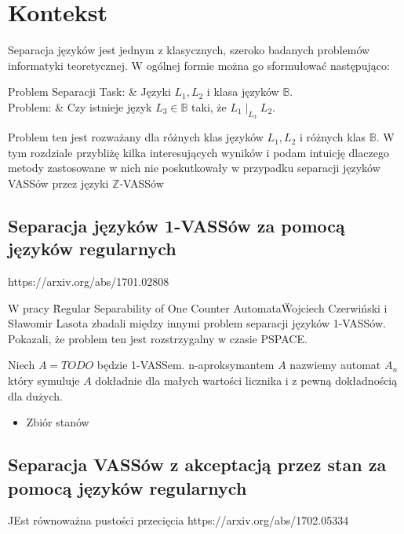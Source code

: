     \chapter{Kontekst}
    Separacja języków jest jednym z klasycznych, szeroko badanych problemów informatyki teoretycznej.
    W ogólnej formie można go sformułować następująco:


    \begin{problem}[]{Problem Separacji}
        Task: & Języki $L_1,L_2$ i klasa języków $\mathbb{B}$.\\
        Problem: & Czy istnieje język $L_3 \in \mathbb{B}$ taki, że $L_1 \mid_{L_3} L_2$. \\
    \end{problem}

    Problem ten jest rozważany dla różnych klas języków $L_1,L_2$ i różnych klas $\mathbb{B}$.
    W tym rozdziale przybliżę kilka interesujących wyników i podam intuicję dlaczego metody zastosowane w nich nie
    poskutkowały w przypadku separacji języków VASSów przez języki $\mathbb{Z}$-VASSów


    \section{Separacja języków 1-VASSów za pomocą języków regularnych}
    https://arxiv.org/abs/1701.02808


    W pracy \"Regular Separability of One Counter Automata\" Wojciech Czerwiński i Sławomir Lasota zbadali między innymi
    problem separacji języków 1-VASSów.
    Pokazali, że problem ten jest rozstrzygalny w czasie PSPACE.

    \begin{definition}
        Niech $A=TODO$ będzie 1-VASSem.
        n-aproksymantem $A$ nazwiemy automat $A_n$ który symuluje $A$ dokładnie dla małych wartości licznika
        i z pewną dokładnością dla dużych.
        \begin{itemize}
            \item   Zbiór stanów
        \end{itemize}
    \end{definition}


    \section{Separacja VASSów z akceptacją przez stan za pomocą języków regularnych}
    JEst równoważna pustości przecięcia
    https://arxiv.org/abs/1702.05334


